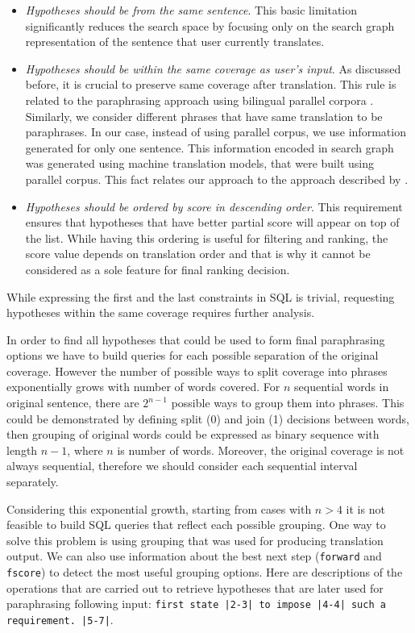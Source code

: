 \begin{itemize}
  \item \emph{Hypotheses should be from the same sentence}. This basic limitation significantly reduces the search space by focusing only on the search graph representation of the sentence that user currently translates.
  \item \emph{Hypotheses should be within the same coverage as user's input}. As discussed before, it is crucial to preserve same coverage after translation. This rule is related to the paraphrasing approach using bilingual parallel corpora \cite{Callison-Burch2007}. Similarly, we consider different phrases that have same translation to be paraphrases. In our case, instead of using parallel corpus, we use information generated for only one sentence. This information encoded in search graph was generated using machine translation models, that were built using parallel corpus. This fact relates our approach to the approach described by \cite{Callison-Burch2007}.
  \item \emph{Hypotheses should be ordered by score in descending order}. This requirement ensures that hypotheses that have better partial score will appear on top of the list. While having this ordering is useful for filtering and ranking, the score value depends on translation order and that is why it cannot be considered as a sole feature for final ranking decision.
\end{itemize}

While expressing the first and the last constraints in SQL is trivial, requesting hypotheses within the same coverage requires further analysis.  

In order to find all hypotheses that could be used to form final paraphrasing options we have to build queries for each possible separation of the original coverage. However the number of possible ways to split coverage into phrases exponentially grows with number of words covered. For $n$ sequential words in original sentence, there are $2^{n-1}$ possible ways to group them into phrases. This could be demonstrated by defining \textsf{split (0)} and \textsf{join (1)} decisions between words, then grouping of original words could be expressed as binary sequence with length $n-1$, where $n$ is number of words. Moreover, the original coverage is not always sequential, therefore we should consider each sequential interval separately.

Considering this exponential growth, starting from cases with $n > 4$ it is not feasible to build SQL queries that reflect each possible grouping. One way to solve this problem is using grouping that was used for producing translation output. We can also use information about the best next step (\texttt{forward} and \texttt{fscore}) to detect the most useful grouping options. Here are descriptions of the operations that are carried out to retrieve hypotheses that are later used for paraphrasing following input: \texttt{first state |2-3| to impose |4-4| such a requirement. |5-7|}.

